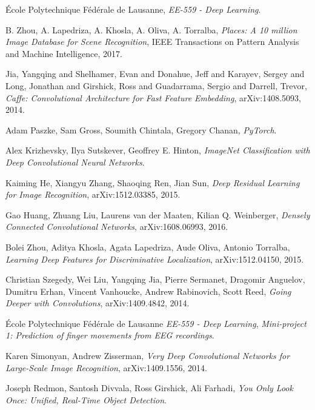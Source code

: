 \begin{thebibliography}{}


	École Polytechnique Fédérale de Lausanne,
	\emph{EE-559 - Deep Learning}.

	B. Zhou, A. Lapedriza, A. Khosla, A. Oliva, A. Torralba,
	\emph{Places: A 10 million Image Database for Scene Recognition},
    IEEE Transactions on Pattern Analysis and Machine Intelligence, 2017.

	Jia, Yangqing and Shelhamer, Evan and Donahue, Jeff and Karayev, Sergey and Long, Jonathan and Girshick, Ross and Guadarrama, Sergio and Darrell, Trevor,
	\emph{Caffe: Convolutional Architecture for Fast Feature Embedding},
    arXiv:1408.5093, 2014.

    Adam Paszke, Sam Gross, Soumith Chintala, Gregory Chanan,
    \emph{PyTorch}.

	Alex Krizhevsky, Ilya Sutskever, Geoffrey E. Hinton,
    \emph{ImageNet Classification with Deep Convolutional Neural Networks}.

	Kaiming He, Xiangyu Zhang, Shaoqing Ren, Jian Sun,
	\emph{Deep Residual Learning for Image Recognition},
    arXiv:1512.03385, 2015.

	Gao Huang, Zhuang Liu, Laurens van der Maaten, Kilian Q. Weinberger,
    \emph{Densely Connected Convolutional Networks},
    arXiv:1608.06993, 2016.

	Bolei Zhou, Aditya Khosla, Agata Lapedriza, Aude Oliva, Antonio Torralba,
	\emph{Learning Deep Features for Discriminative Localization},
	arXiv:1512.04150, 2015.

	Christian Szegedy, Wei Liu, Yangqing Jia, Pierre Sermanet, Dragomir Anguelov, Dumitru Erhan, Vincent Vanhoucke, Andrew Rabinovich, Scott Reed,
	\emph{Going Deeper with Convolutions},
	arXiv:1409.4842, 2014.


	École Polytechnique Fédérale de Lausanne
	\emph{EE-559 - Deep Learning},
	\emph{Mini-project 1: Prediction of finger movements from EEG recordings}.

	Karen Simonyan, Andrew Zisserman,
    \emph{Very Deep Convolutional Networks for Large-Scale Image Recognition},
    arXiv:1409.1556, 2014.

    Joseph Redmon, Santosh Divvala, Ross Girshick, Ali Farhadi,
    \emph{You Only Look Once: Unified, Real-Time Object Detection}.


\end{thebibliography}
